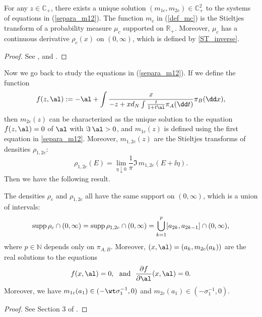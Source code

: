 
\begin{theorem} 
For any $z\in \mathbb C_+$, there exists a unique solution $(m_{1c},m_{2c})\in \mathbb C_+^2$ to the systems of equations in (\ref{separa_m12}). The function $m_c$ in (\ref{def_mc}) is the Stieltjes transform of a probability measure $\mu_c$ supported on $\mathbb R_+$. Moreover, $\mu_c$ has a continuous derivative $\rho_c(x)$ on $(0,\infty)$, which is defined by \eqref{ST_inverse}.
\end{theorem}
\begin{proof}
See {\cite[Theorem 1.2.1]{Zhang_thesis}}, {\cite[Theorem 2.4]{Hachem2007}} and {\cite[Theorem 3.1]{Separable_solution}}.
\end{proof}



 
Now we go back to study the equations in (\ref{separa_m12}). If we define the function
\begin{equation}\label{separable_MP}
f(z,\al):=- \al + \int\frac{x}{-z+xd_N \int\frac{t}{1+t\al} \pi_A(\dd t)} \pi_B(\dd x) ,
\end{equation}
then $m_{2c}(z)$ can be characterized as the unique solution to the equation $f(z,\al)=0$ of $\al$ with $\Im \, \al> 0$, and $m_{1c}(z)$ is defined using the first equation in \eqref{separa_m12}.
Moreover, $m_{1,2c}(z)$ are the Stieltjes transforms of densities $\rho_{1,2c}$:
$$\rho_{1,2c}(E) = \lim_{\eta\downarrow 0} \frac{1}{\pi}\Im\, m_{1,2c}(E+\ii \eta).$$
Then we have the following result.

\begin{lemma}\label{lambdar}%
The densities $\rho_{c}$ and $\rho_{1,2c}$ all have the same support on $(0,\infty)$, which is a union of intervals: %
\begin{equation}\label{support_rho1c}
{\rm{supp}} \, \rho_{c} \cap (0,\infty) ={\rm{supp}} \, \rho_{1,2c} \cap (0,\infty) = \bigcup_{k=1}^p [a_{2k}, a_{2k-1}] \cap (0,\infty),
\end{equation}
where $p\in \mathbb N$ depends only on $\pi_{A,B}$. Moreover, $(x,\al)=(a_k, m_{2c}(a_k))$ are the real solutions to the equations
\begin{equation}
f(x,\al)=0, \ \ \text{and} \ \ \frac{\partial f}{\partial \al}(x,\al) = 0. \label{equationEm2}
\end{equation}
Moreover, we have $m_{1c}(a_1) \in (-\wt \sigma_1^{-1}, 0)$ and $m_{2c}(a_1) \in (-\sigma_1^{-1}, 0)$. %
\end{lemma}
\begin{proof}
See Section 3 of \cite{Separable_solution}.
\end{proof}

